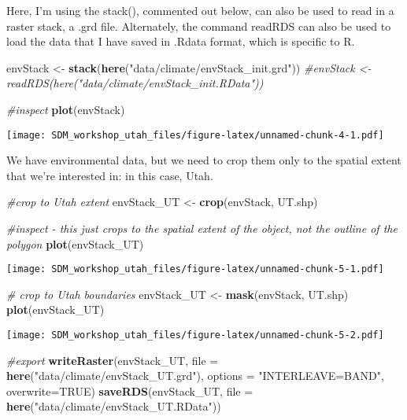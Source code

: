 \documentclass[]{article}
\newenvironment{Shaded}{\begin{snugshade}}{\end{snugshade}}
\newcommand{\KeywordTok}[1]{\textcolor[rgb]{0.13,0.29,0.53}{\textbf{#1}}}
\newcommand{\DataTypeTok}[1]{\textcolor[rgb]{0.13,0.29,0.53}{#1}}
\newcommand{\StringTok}[1]{\textcolor[rgb]{0.31,0.60,0.02}{#1}}
\newcommand{\CommentTok}[1]{\textcolor[rgb]{0.56,0.35,0.01}{\textit{#1}}}
\newcommand{\OtherTok}[1]{\textcolor[rgb]{0.56,0.35,0.01}{#1}}
\newcommand{\NormalTok}[1]{#1}
\begin{document}
Here, I'm using the stack(), commented out below, can also be used to
read in a raster stack, a .grd file. Alternately, the command readRDS
can also be used to load the data that I have saved in .Rdata format,
which is specific to R.

\begin{Shaded}
\begin{Highlighting}[]
\NormalTok{envStack <-}\StringTok{ }\KeywordTok{stack}\NormalTok{(}\KeywordTok{here}\NormalTok{(}\StringTok{"data/climate/envStack_init.grd"}\NormalTok{))}
\CommentTok{#envStack <- readRDS(here("data/climate/envStack_init.RData"))}

\CommentTok{#inspect}
\KeywordTok{plot}\NormalTok{(envStack)}
\end{Highlighting}
\end{Shaded}

\texttt{[image: SDM\_workshop\_utah\_files/figure-latex/unnamed-chunk-4-1.pdf]}

We have environmental data, but we need to crop them only to the spatial
extent that we're interested in: in this case, Utah.

\begin{Shaded}
\begin{Highlighting}[]
\CommentTok{#crop to Utah extent}
\NormalTok{envStack_UT <-}\StringTok{ }\KeywordTok{crop}\NormalTok{(envStack, UT.shp)}

\CommentTok{#inspect - this just crops to the spatial extent of the object, not the outline of the polygon}
\KeywordTok{plot}\NormalTok{(envStack_UT)}
\end{Highlighting}
\end{Shaded}

\texttt{[image: SDM\_workshop\_utah\_files/figure-latex/unnamed-chunk-5-1.pdf]}

\begin{Shaded}
\begin{Highlighting}[]
\CommentTok{# crop to Utah boundaries}
\NormalTok{envStack_UT <-}\StringTok{ }\KeywordTok{mask}\NormalTok{(envStack, UT.shp)}
\KeywordTok{plot}\NormalTok{(envStack_UT)}
\end{Highlighting}
\end{Shaded}

\texttt{[image: SDM\_workshop\_utah\_files/figure-latex/unnamed-chunk-5-2.pdf]}

\begin{Shaded}
\begin{Highlighting}[]
\CommentTok{#export}
\KeywordTok{writeRaster}\NormalTok{(envStack_UT, }\DataTypeTok{file =} \KeywordTok{here}\NormalTok{(}\StringTok{"data/climate/envStack_UT.grd"}\NormalTok{), }\DataTypeTok{options =} \StringTok{"INTERLEAVE=BAND"}\NormalTok{, }\DataTypeTok{overwrite=}\OtherTok{TRUE}\NormalTok{)}
\KeywordTok{saveRDS}\NormalTok{(envStack_UT, }\DataTypeTok{file =} \KeywordTok{here}\NormalTok{(}\StringTok{"data/climate/envStack_UT.RData"}\NormalTok{))}
\end{Highlighting}
\end{Shaded}
\end{document}
